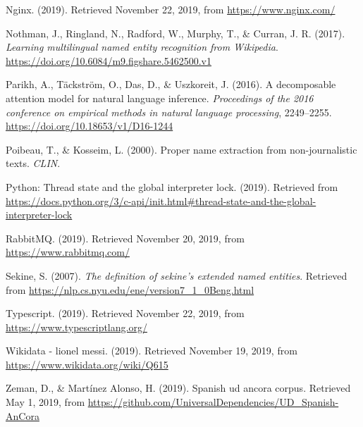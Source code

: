 \documentclass[12pt,a4paper,]{scrartcl}
\begin{document}
\leavevmode\hypertarget{ref-nginx}{}%
Nginx. (2019). Retrieved November 22, 2019, from \url{https://www.nginx.com/}

\leavevmode\hypertarget{ref-Nothman2017}{}%
Nothman, J., Ringland, N., Radford, W., Murphy, T., \& Curran, J. R. (2017). \emph{Learning multilingual named entity recognition from Wikipedia}. \url{https://doi.org/10.6084/m9.figshare.5462500.v1}

\leavevmode\hypertarget{ref-parikh-etal-2016-decomposable}{}%
Parikh, A., Täckström, O., Das, D., \& Uszkoreit, J. (2016). A decomposable attention model for natural language inference. \emph{Proceedings of the 2016 conference on empirical methods in natural language processing}, 2249--2255. \url{https://doi.org/10.18653/v1/D16-1244}

\leavevmode\hypertarget{ref-Poibeau2000ProperNE}{}%
Poibeau, T., \& Kosseim, L. (2000). Proper name extraction from non-journalistic texts. \emph{CLIN}.

\leavevmode\hypertarget{ref-python_gil}{}%
Python: Thread state and the global interpreter lock. (2019). Retrieved from \url{https://docs.python.org/3/c-api/init.html\#thread-state-and-the-global-interpreter-lock}

\leavevmode\hypertarget{ref-rabbitmq}{}%
RabbitMQ. (2019). Retrieved November 20, 2019, from \url{https://www.rabbitmq.com/}

\leavevmode\hypertarget{ref-Sekine-NER}{}%
Sekine, S. (2007). \emph{The definition of sekine's extended named entities}. Retrieved from \url{https://nlp.cs.nyu.edu/ene/version7_1_0Beng.html}

\leavevmode\hypertarget{ref-typescript}{}%
Typescript. (2019). Retrieved November 22, 2019, from \url{https://www.typescriptlang.org/}

\leavevmode\hypertarget{ref-wikidata_messi}{}%
Wikidata - lionel messi. (2019). Retrieved November 19, 2019, from \url{https://www.wikidata.org/wiki/Q615}

\leavevmode\hypertarget{ref-ancora-es}{}%
Zeman, D., \& Martínez Alonso, H. (2019). Spanish ud ancora corpus. Retrieved May 1, 2019, from \url{https://github.com/UniversalDependencies/UD_Spanish-AnCora}
\end{document}
